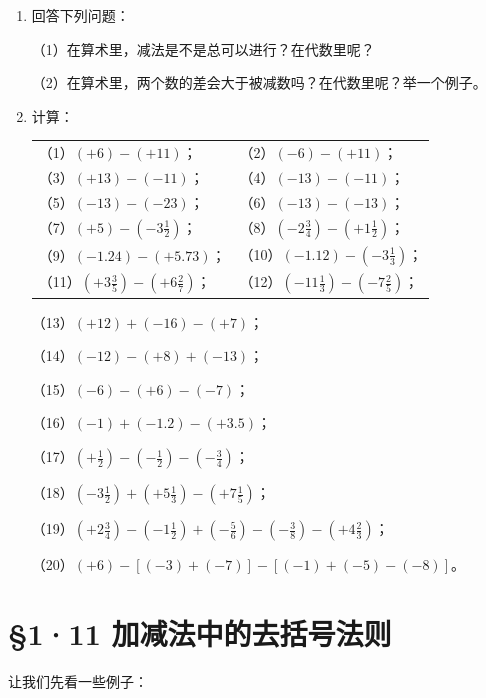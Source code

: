 \begin{enumerate}
\item 回答下列问题：
  \par\smallskip
  （1）在算术里，减法是不是总可以进行？在代数里呢？
  \par
  （2）在算术里，两个数的差会大于被减数吗？在代数里呢？举一个例子。
\item 计算：
  \par\smallskip
  \begin{tabular}{@{}ll@{}}
  （1）\((+6) - (+11)\)； & （2）\((-6) - (+11)\)； \\[4pt]
  （3）\((+13) - (-11)\)； & （4）\((-13) - (-11)\)； \\[4pt]
  （5）\((-13) - (-23)\)； & （6）\((-13) - (-13)\)； \\[4pt]
  （7）\((+5) - \left(-3\frac{1}{2}\right)\)； & （8）\(\left(-2\frac{3}{4}\right) - \left(+1\frac{1}{2}\right)\)； \\[4pt]
  （9）\((-1.24) - (+5.73)\)； & （10）\((-1.12) - \left(-3\frac{1}{3}\right)\)； \\[4pt]
  （11）\(\left(+3\frac{3}{5}\right) - \left(+6\frac{2}{7}\right)\)； & （12）\(\left(-11\frac{1}{3}\right) - \left(-7\frac{2}{5}\right)\)；
  \end{tabular}
  \par\smallskip
  （13）\((+12) + (-16) - (+7)\)；
  \par
  （14）\((-12) - (+8) + (-13)\)；
  \par
  （15）\((-6) - (+6) - (-7)\)；
  \par
  （16）\((-1) + (-1.2) - (+3.5)\)；
  \par
  （17）\(\left(+\frac{1}{2}\right) - \left(-\frac{1}{2}\right) - \left(-\frac{3}{4}\right)\)；
  \par
  （18）\(\left(-3\frac{1}{2}\right) + \left(+5\frac{1}{3}\right) - \left(+7\frac{1}{5}\right)\)；
  \par
  （19）\(\left(+2\frac{3}{4}\right) - \left(-1\frac{1}{2}\right) + \left(-\frac{5}{6}\right) - \left(-\frac{3}{8}\right) - \left(+4\frac{2}{3}\right)\)；
  \par
  （20）\((+6) - [(-3) + (-7)] - [(-1) + (-5) - (-8)]\)。
\end{enumerate}

\section{§1·11 加减法中的去括号法则}

让我们先看一些例子：

